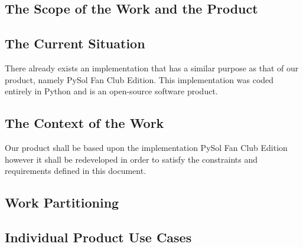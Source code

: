 \documentclass{article}
\begin{document}
		\subsection*{The Scope of the Work and the Product}
		\subsection{The Current Situation}
		\indent There already exists an implementation that has a similar purpose as
		that of our product, namely PySol Fan Club Edition. This implementation was
		coded entirely in Python and is an open-source software product.\\
		\subsection{The Context of the Work}
		\indent Our product shall be based upon the implementation PySol Fan Club
		Edition however it shall be redeveloped in order to satisfy the constraints
		and requirements defined in this document.\\
		\subsection{Work Partitioning}
		\subsection{Individual Product Use Cases}
\end{document}
